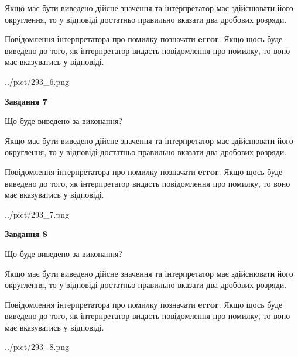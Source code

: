 \documentclass[12pt, ukrainian]{article}
\begin{document}
{\begin {Large}
Якщо має бути виведено дійсне значення та інтерпретатор має здійснювати його округлення, 
то у відповіді достатньо правильно вказати два дробових розряди.

Повідомлення інтерпретатора про помилку позначати \textbf{error}.
Якщо щось буде виведено до того, як інтерпретатор видасть повідомлення про помилку, 
то воно має вказуватись у відповіді. \par

\begin{center}
	{../pict/293_6.png}
\end{center}
\newpage

{\begin {center}\textbf{Завдання 7}\end {center}}\par
Що буде виведено за виконання? \par

Якщо має бути виведено дійсне значення та інтерпретатор має здійснювати його округлення, 
то у відповіді достатньо правильно вказати два дробових розряди.

Повідомлення інтерпретатора про помилку позначати \textbf{error}.
Якщо щось буде виведено до того, як інтерпретатор видасть повідомлення про помилку, 
то воно має вказуватись у відповіді. \par

\begin{center}
	{../pict/293_7.png}
\end{center}
\newpage

{\begin {center}\textbf{Завдання 8}\end {center}}\par
Що буде виведено за виконання? \par

Якщо має бути виведено дійсне значення та інтерпретатор має здійснювати його округлення, 
то у відповіді достатньо правильно вказати два дробових розряди.

Повідомлення інтерпретатора про помилку позначати \textbf{error}.
Якщо щось буде виведено до того, як інтерпретатор видасть повідомлення про помилку, 
то воно має вказуватись у відповіді. \par

\begin{center}
	{../pict/293_8.png}
\end{center}
\newpage


\end{Large}}
\end{document}
